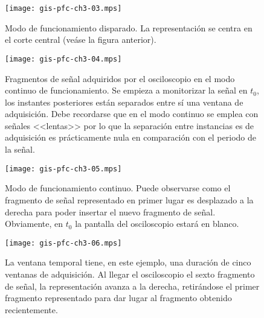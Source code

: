 \documentclass[a4paper,12pt]{article}
\begin{document}
\begin{figure}
	\begin{center}
		\texttt{[image: gis-pfc-ch3-03.mps]}
	\end{center}
	\caption[Modo de funcionamiento disparado]{Modo de funcionamiento disparado. La representación se centra en el corte central (veáse la figura anterior).}
	\label{fig:digtrigosc}
\end{figure}

\clearpage

\begin{figure}
	\begin{center}
		\texttt{[image: gis-pfc-ch3-04.mps]}
	\end{center}
	\caption[Fragmentos de señal ordenados según llegan al osciloscopio]{Fragmentos de señal adquiridos por el osciloscopio en el modo continuo de funcionamiento. Se empieza a monitorizar la señal en $t_0$, los instantes posteriores están separados entre sí una ventana de adquisición. Debe recordarse que en el modo continuo se emplea con señales <<lentas>> por lo que la separación entre instancias es de adquisición es prácticamente nula en comparación con el periodo de la señal.}
	\label{fig:freesignalcont}
\end{figure}

\begin{figure}
	\begin{center}
		\texttt{[image: gis-pfc-ch3-05.mps]}
	\end{center}
	\caption[Modo de funcionamiento continuo del osciloscopio]{Modo de funcionamiento continuo. Puede observarse como el fragmento de señal representado en primer lugar es desplazado a la derecha para poder insertar el nuevo fragmento de señal. Obviamente, en $t_0$ la pantalla del osciloscopio estará en blanco.}
	\label{fig:digcontosc}
\end{figure}

\begin{figure}
	\begin{center}
		\texttt{[image: gis-pfc-ch3-06.mps]}
	\end{center}
	\caption[Modo de funcionamiento continuo]{La ventana temporal tiene, en este ejemplo, una duración de cinco ventanas de adquisición. Al llegar el osciloscopio el sexto fragmento de señal, la representación avanza a la derecha, retirándose el primer fragmento representado para dar lugar al fragmento obtenido recientemente.}
	\label{fig:digcontosccont}
\end{figure}
\end{document}

